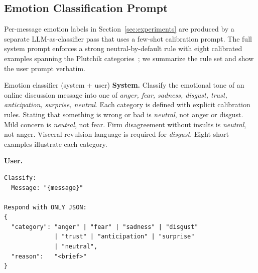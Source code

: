 \subsection{Emotion Classification Prompt}

Per-message emotion labels in Section~\ref{sec:experiments} are produced by a separate LLM-as-classifier pass that uses a few-shot calibration prompt. The full system prompt enforces a strong neutral-by-default rule with eight calibrated examples spanning the Plutchik categories~\citep{Plutchik1980,Mohammad2018}; we summarize the rule set and show the user prompt verbatim.

\begin{npromptbox}{Emotion classifier (system + user)}
\textbf{System.} Classify the emotional tone of an online discussion message into one of \emph{anger, fear, sadness, disgust, trust, anticipation, surprise, neutral}. Each category is defined with explicit calibration rules. Stating that something is wrong or bad is \emph{neutral}, not anger or disgust. Mild concern is \emph{neutral}, not fear. Firm disagreement without insults is \emph{neutral}, not anger. Visceral revulsion language is required for \emph{disgust}. Eight short examples illustrate each category.

\medskip
\textbf{User.}
\begin{verbatim}
Classify:
  Message: "{message}"

Respond with ONLY JSON:
{
  "category": "anger" | "fear" | "sadness" | "disgust"
              | "trust" | "anticipation" | "surprise"
              | "neutral",
  "reason":   "<brief>"
}
\end{verbatim}
\end{npromptbox}
